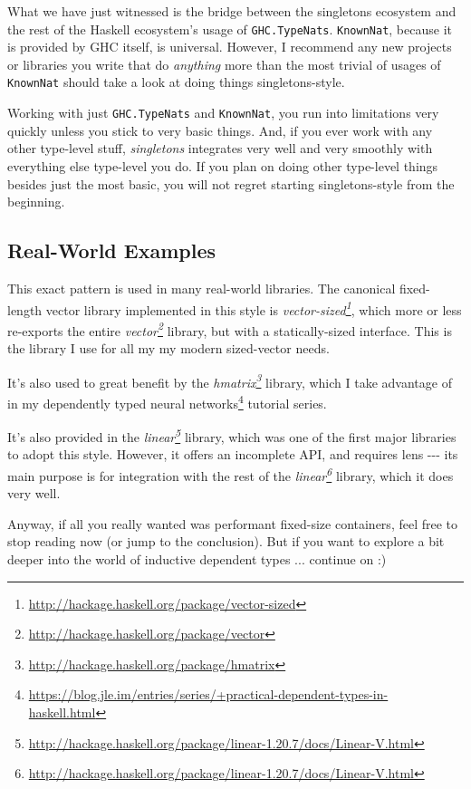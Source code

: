 \documentclass[]{article}
\renewcommand{\href}[2]{#2\footnote{\url{#1}}}
\begin{document}
What we have just witnessed is the bridge between the singletons ecosystem and
the rest of the Haskell ecosystem's usage of \texttt{GHC.TypeNats}.
\texttt{KnownNat}, because it is provided by GHC itself, is universal. However,
I recommend any new projects or libraries you write that do \emph{anything} more
than the most trivial of usages of \texttt{KnownNat} should take a look at doing
things singletons-style.

Working with just \texttt{GHC.TypeNats} and \texttt{KnownNat}, you run into
limitations very quickly unless you stick to very basic things. And, if you ever
work with any other type-level stuff, \emph{singletons} integrates very well and
very smoothly with everything else type-level you do. If you plan on doing other
type-level things besides just the most basic, you will not regret starting
singletons-style from the beginning.

\subsection{Real-World Examples}

This exact pattern is used in many real-world libraries. The canonical
fixed-length vector library implemented in this style is
\emph{\href{http://hackage.haskell.org/package/vector-sized}{vector-sized}},
which more or less re-exports the entire
\emph{\href{http://hackage.haskell.org/package/vector}{vector}} library, but
with a statically-sized interface. This is the library I use for all my my
modern sized-vector needs.

It's also used to great benefit by the
\emph{\href{http://hackage.haskell.org/package/hmatrix}{hmatrix}} library, which
I take advantage of in my
\href{https://blog.jle.im/entries/series/+practical-dependent-types-in-haskell.html}{dependently
typed neural networks} tutorial series.

It's also provided in the
\emph{\href{http://hackage.haskell.org/package/linear-1.20.7/docs/Linear-V.html}{linear}}
library, which was one of the first major libraries to adopt this style.
However, it offers an incomplete API, and requires lens -\/-\/- its main purpose
is for integration with the rest of the
\emph{\href{http://hackage.haskell.org/package/linear-1.20.7/docs/Linear-V.html}{linear}}
library, which it does very well.

Anyway, if all you really wanted was performant fixed-size containers, feel free
to stop reading now (or jump to the conclusion). But if you want to explore a
bit deeper into the world of inductive dependent types ... continue on :)
\end{document}
